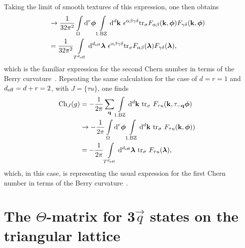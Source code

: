 \documentclass[
    10pt,
    aps,
    prb,
    twocolumn,
    floatfix,
    superscriptaddress,
]{revtex4-2}
\begin{document}
Taking the limit of smooth textures of this expression, one then obtains
\begin{align}
 & \to \frac{1}{32 \pi^2} \int\limits_{\Omega} \mathrm{d}^r\boldsymbol{\phi}
 \int\limits_{\mathrm{1.BZ}} \mathrm{d}^d \mathbf{k} ~ \epsilon^{\alpha\beta\gamma\delta}
 \mathrm{tr}_\sigma F_{\alpha \beta}(\mathbf{k},\boldsymbol{\phi}) F_{\gamma\delta}(\mathbf{k}, \boldsymbol{\phi}) 
 \notag \\
 & = \frac{1}{32 \pi^2} \int\limits_{T^{{d_\mathrm{eff}}}}  \mathrm{d}^{d_\mathrm{eff}} \boldsymbol{\lambda}
  ~ \epsilon^{\alpha\beta\gamma\delta}
 \mathrm{tr}_\sigma F_{\alpha \beta}(\boldsymbol{\lambda}) F_{\gamma\delta}(\boldsymbol{\lambda}) ,
\end{align}
which is the familiar expression for the second Chern number in terms of the Berry curvature~\cite{Qi2008}.
Repeating the same calculation for the case of $d=r=1$ and ${d_\mathrm{eff}} =d+r=2$, with $J=\lbrace \tau u \rbrace $, one finds
\begin{align}
	{\rm Ch}_{J}(g)
 & =- \frac{1}{2 \pi}\sum_{\mathbf{q}}
 \int\limits_{\mathrm{1.BZ}}\mathrm{d}^d \mathbf{k} ~
 \mathrm{tr}_\sigma ~F_{\tau u}(\mathbf{k}, \tau_{-\mathbf{q}}\boldsymbol{\phi}) 
 \notag \\
 & \to -\frac{1}{2 \pi} \int\limits_{\Omega} \mathrm{d}^r\boldsymbol{\phi}
 \int\limits_{\mathrm{1.BZ}} \mathrm{d}^d \mathbf{k} ~
 \mathrm{tr}_\sigma ~F_{\tau u}(\mathbf{k},\boldsymbol{\phi}) ) 
 \notag \\
 & = -\frac{1}{2 \pi} \int\limits_{T^{{d_\mathrm{eff}}}}  \mathrm{d}^{d_\mathrm{eff}} \boldsymbol{\lambda}
  ~
 \mathrm{tr}_\sigma ~F_{\tau u}(\boldsymbol{\lambda})  ,
\end{align}
which, in this case, is representing the usual expression for the first Chern number in terms of the Berry curvature~\cite{Qi2008}. 


\section{The \texorpdfstring{$\Theta$-matrix}{Theta-matrix} for \texorpdfstring{3$\vec{q}$}{3q} states on the triangular lattice}
\label{app:theta_matrix_triangular_lattice}
\end{document}
